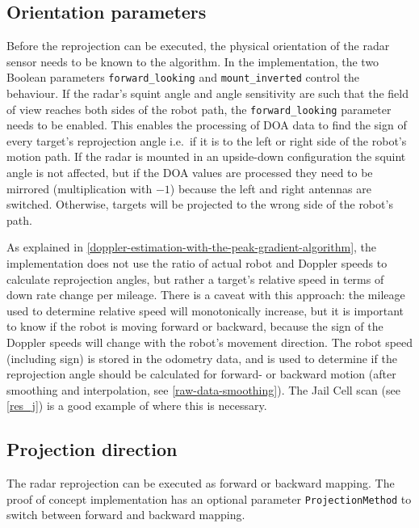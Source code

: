 \subsection{Orientation parameters}\label{orientation-parameters}

Before the reprojection can be executed, the physical orientation of the
radar sensor needs to be known to the algorithm. In the implementation,
the two Boolean parameters \texttt{forward\_looking} and
\texttt{mount\_inverted} control the behaviour. If the radar's squint
angle and angle sensitivity are such that the field of view reaches both
sides of the robot path, the \texttt{forward\_looking} parameter needs
to be enabled. This enables the processing of DOA data to find the sign
of every target's reprojection angle i.e.~if it is to the left or right
side of the robot's motion path. If the radar is mounted in an
upside-down configuration the squint angle is not affected, but if the
DOA values are processed they need to be mirrored (multiplication with
\(-1\)) because the left and right antennas are switched. Otherwise,
targets will be projected to the wrong side of the robot's path.

As explained in \cref{doppler-estimation-with-the-peak-gradient-algorithm}, the implementation does not use the ratio of actual robot and Doppler speeds to calculate reprojection angles, but rather a target's relative speed in terms of down rate change per mileage. There is a caveat with this approach: the mileage used to determine relative speed will monotonically increase, but it is important to know if the robot is moving forward or backward, because the sign of the Doppler speeds will change with the robot's movement direction. The robot speed (including sign) is stored in the odometry data, and is used to determine if the reprojection angle should be calculated for forward- or backward motion (after smoothing and interpolation, see \cref{raw-data-smoothing}). The Jail Cell scan (see \cref{res_j}) is a good example of where this is necessary.

\subsection{Projection direction}\label{projection-direction}

The radar reprojection can be executed as forward or backward mapping.
The proof of concept implementation has an optional parameter
\texttt{ProjectionMethod} to switch between forward and backward
mapping.

